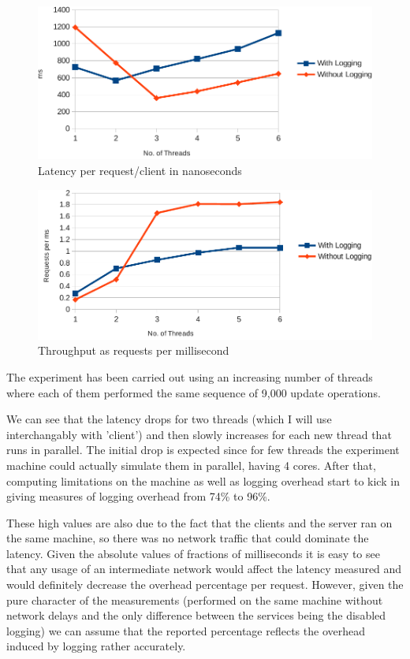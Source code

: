 \documentclass[a4paper,11pt]{article}
\begin{document}
\begin{figure}[ht]
  \centering
  \includegraphics[width=\textwidth]{../experiment/latency-crop-split.pdf}
  \caption{Latency per request/client in nanoseconds}
  \label{fig:latency}
\end{figure}

\begin{figure}[ht]
  \centering
  \includegraphics[width=\textwidth]{../experiment/throughput-crop-split.pdf}
  \caption{Throughput as requests per millisecond}
  \label{fig:throughput}  
\end{figure}

The experiment has been carried out using an increasing number of threads where each of them performed the same sequence of 9,000 update operations.

We can see that the latency drops for two threads (which I will use interchangably with 'client') and then slowly increases for each new thread that runs in parallel. The initial drop is expected since for few threads the experiment machine could actually simulate them in parallel, having 4 cores. After that, computing limitations on the machine as well as logging overhead start to kick in giving measures of logging overhead from 74\% to 96\%.

These high values are also due to the fact that the clients and the server ran on the same machine, so there was no network traffic that could dominate the latency. Given the absolute values of fractions of milliseconds it is easy to see that any usage of an intermediate network would affect the latency measured and would definitely decrease the overhead percentage per request. However, given the pure character of the measurements (performed on the same machine without network delays and the only difference between the services being the disabled logging) we can assume that the reported percentage reflects the overhead induced by logging rather accurately.
\end{document}
